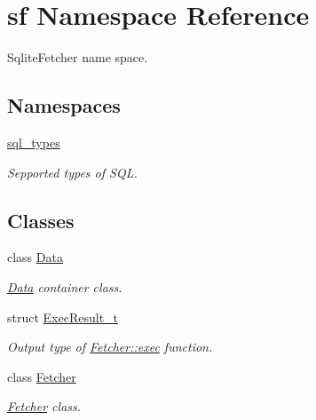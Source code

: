 \hypertarget{namespacesf}{}\section{sf Namespace Reference}
\label{namespacesf}


Sqlite\+Fetcher name space.  


\subsection*{Namespaces}
\begin{DoxyCompactItemize}
\item 
 \hyperlink{namespacesf_1_1sql__types}{sql\+\_\+types}
\begin{DoxyCompactList}\small\item\em Sepported types of S\+QL. \end{DoxyCompactList}\end{DoxyCompactItemize}
\subsection*{Classes}
\begin{DoxyCompactItemize}
\item 
class \hyperlink{classsf_1_1Data}{Data}
\begin{DoxyCompactList}\small\item\em \hyperlink{classsf_1_1Data}{Data} container class. \end{DoxyCompactList}\item 
struct \hyperlink{structsf_1_1ExecResult__t}{Exec\+Result\+\_\+t}
\begin{DoxyCompactList}\small\item\em Output type of \hyperlink{classsf_1_1Fetcher_a1f89a1897ae6f8f4aaf66e4a81a2ac23}{Fetcher\+::exec} function. \end{DoxyCompactList}\item 
class \hyperlink{classsf_1_1Fetcher}{Fetcher}
\begin{DoxyCompactList}\small\item\em \hyperlink{classsf_1_1Fetcher}{Fetcher} class. \end{DoxyCompactList}\end{DoxyCompactItemize}
